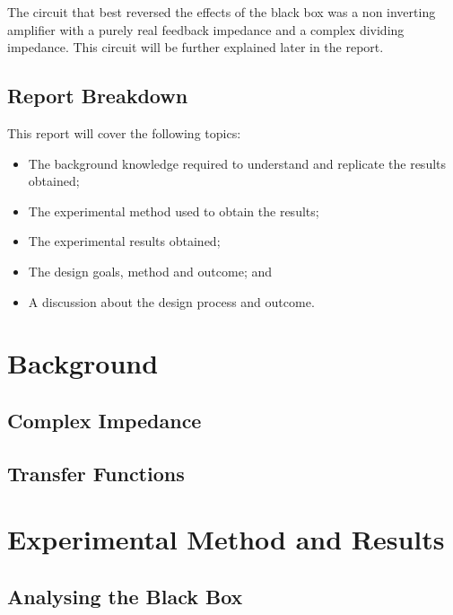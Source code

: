 \documentclass[12pt]{article} %
\begin{document}
The circuit that best reversed the effects of the black box was a non inverting amplifier with a purely real feedback impedance and a complex dividing impedance. This circuit will be further explained later in the report.

\subsection{Report Breakdown}

This report will cover the following topics:
\begin{itemize} \itemsep1pt
	\item The background knowledge required to understand and replicate the results obtained;
	\item The experimental method used to obtain the results;
	\item The experimental results obtained;
	\item The design goals, method and outcome; and
	\item A discussion about the design process and outcome.
\end{itemize}

\pagebreak





\section{Background}

\subsection{Complex Impedance}



\subsection{Transfer Functions}


\pagebreak





\section{Experimental Method and Results}

\subsection{Analysing the Black Box}
\end{document}
